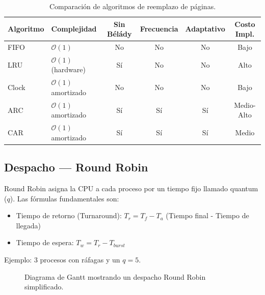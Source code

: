 \documentclass[12pt,letterpaper]{article}
\begin{document}
\begin{table}[H]
\centering
{}
\begin{tabular}{@{}llcccc@{}}
\toprule
\rowcolor{catBlue!40}
\textbf{Algoritmo} & \textbf{Complejidad} & \textbf{Sin Bélády} & \textbf{Frecuencia} & \textbf{Adaptativo} & \textbf{Costo Impl.} \\ \midrule
FIFO  & $\mathcal{O}(1)$ & No & No & No & Bajo \\
LRU   & $\mathcal{O}(1)$ (hardware) & Sí & No & No & Alto \\
Clock & $\mathcal{O}(1)$ amortizado & No & No & No & Bajo \\
ARC   & $\mathcal{O}(1)$ amortizado & Sí & Sí & Sí & Medio-Alto \\
CAR   & $\mathcal{O}(1)$ amortizado & Sí & Sí & Sí & Medio \\ \bottomrule
\end{tabular}
\caption{Comparación de algoritmos de reemplazo de páginas.}
\label{tab:alg_comp}
\end{table}

\subsection{Despacho --- Round Robin}
Round Robin asigna la CPU a cada proceso
por un tiempo fijo llamado quantum ($q$).
Las fórmulas fundamentales son:
\begin{itemize}
    \item Tiempo de retorno (Turnaround): $T_r = T_f - T_a$ (Tiempo final - Tiempo de llegada)
    \item Tiempo de espera: $T_w = T_r - T_{burst}$
\end{itemize}

Ejemplo: 3 procesos con ráfagas y un $q=5$.
\begin{figure}[H]
\centering
{}
\caption{Diagrama de Gantt mostrando un despacho Round Robin simplificado.}
\end{figure}
\end{document}
